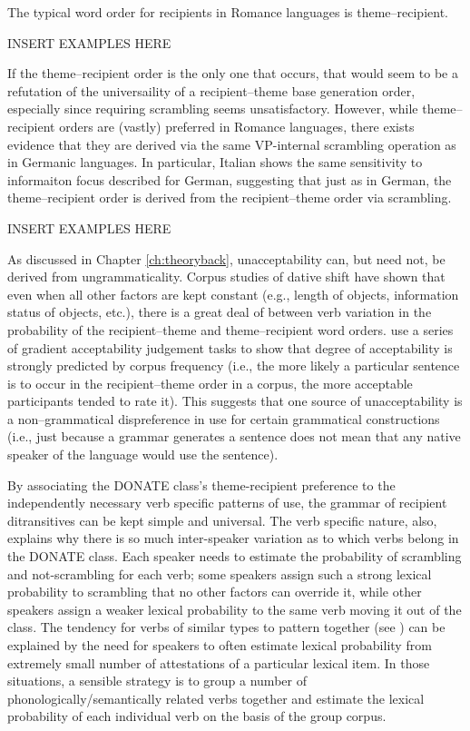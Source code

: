 The typical word order for recipients in Romance languages is theme--recipient.

INSERT EXAMPLES HERE

If the theme--recipient order is the only one that occurs, that would seem to be a refutation of the universaility of a recipient--theme base generation order, especially since requiring scrambling seems unsatisfactory. However, while theme--recipient orders are (vastly) preferred in Romance languages, there exists evidence that they are derived via the same VP-internal scrambling operation as in Germanic languages. In particular, Italian shows the same sensitivity to informaiton focus described for German, suggesting that just as in German, the theme--recipient order is derived from the recipient--theme order via scrambling.

INSERT EXAMPLES HERE

As discussed in Chapter \ref{ch:theoryback}, unacceptability can, but need not, be derived from ungrammaticality. Corpus studies of dative shift \citep{Collins.1995,Bresnan.2007,Bresnan.2009} have shown that even when all other factors are kept constant (e.g., length of objects, information status of objects, etc.), there is a great deal of between verb variation in the probability of the recipient--theme and theme--recipient word orders. \cite{Bresnan.2010} use a series of gradient acceptability judgement tasks to show that degree of acceptability is strongly predicted by corpus frequency (i.e., the more likely a particular sentence is to occur in the recipient--theme order in a corpus, the more acceptable participants tended to rate it). This suggests that one source of unacceptability is a non--grammatical dispreference in use for certain grammatical constructions (i.e., just because a grammar generates a sentence does not mean that any native speaker of the language would use the sentence). 

By associating the DONATE class's theme-recipient preference to the independently necessary verb specific patterns of use, the grammar of recipient ditransitives can be kept simple and universal. The verb specific nature, also, explains why there is so much inter-speaker variation as to which verbs belong in the DONATE class. Each speaker needs to estimate the probability of scrambling and not-scrambling for each verb; some speakers assign such a strong lexical probability to scrambling that no other factors can override it, while other speakers assign a weaker lexical probability to the same verb moving it out of the class. The tendency for verbs of similar types to pattern together (see \citealt{Levin.1993}) can be explained by the need for speakers to often estimate lexical probability from extremely small number of attestations of a particular lexical item. In those situations, a sensible strategy is to group a number of phonologically/semantically related verbs together and estimate the lexical probability of each individual verb on the basis of the group corpus.

